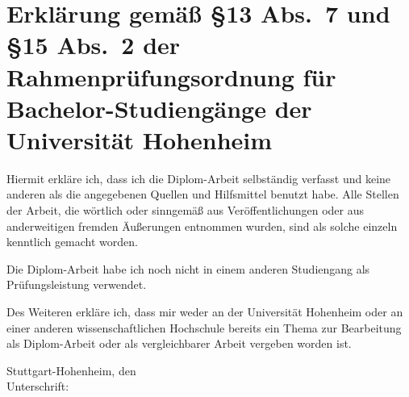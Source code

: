 \newpage

\thispagestyle{empty}

\section*{Erklärung gemäß §13 Abs.~7 und §15 Abs.~2  der Rahmenprüfungsordnung für Bachelor-Studiengänge der
Universität Hohenheim}

Hiermit erkläre ich, dass ich die Diplom-Arbeit selbständig verfasst und keine anderen als die
angegebenen Quellen und Hilfsmittel benutzt habe. Alle Stellen der Arbeit, die wörtlich oder
sinngemäß aus Veröffentlichungen oder aus anderweitigen fremden Äußerungen entnommen wurden, sind
als solche einzeln kenntlich gemacht worden.

Die Diplom-Arbeit habe ich noch nicht in einem anderen Studiengang als Prüfungsleistung verwendet.

Des Weiteren erkläre ich, dass mir weder an der Universität Hohenheim oder an einer anderen
wissenschaftlichen Hochschule bereits ein Thema zur Bearbeitung als Diplom-Arbeit oder als
vergleichbarer Arbeit vergeben worden ist.


\begin{tabbing}
Stuttgart-Hohenheim, den \qquad\= \underline{\hspace{9cm}} \\[2em]
Unterschrift: \> \underline{\hspace{9cm}}
\end{tabbing}





